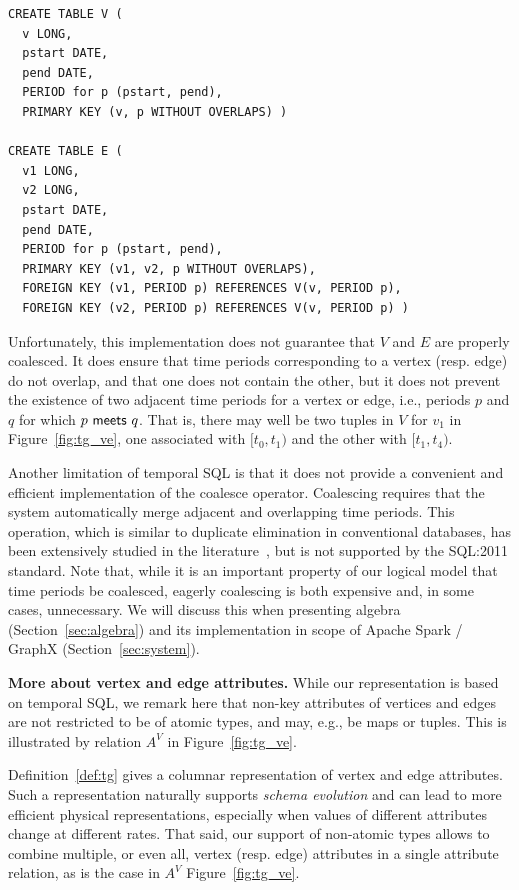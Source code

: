 \begin{small}
\begin{verbatim}
CREATE TABLE V (
  v LONG,
  pstart DATE,
  pend DATE,
  PERIOD for p (pstart, pend),
  PRIMARY KEY (v, p WITHOUT OVERLAPS) )

CREATE TABLE E (
  v1 LONG,
  v2 LONG,
  pstart DATE,
  pend DATE,
  PERIOD for p (pstart, pend),
  PRIMARY KEY (v1, v2, p WITHOUT OVERLAPS),
  FOREIGN KEY (v1, PERIOD p) REFERENCES V(v, PERIOD p),
  FOREIGN KEY (v2, PERIOD p) REFERENCES V(v, PERIOD p) )
\end{verbatim}
\end{small}

Unfortunately, this implementation does not guarantee that $V$ and $E$
are properly coalesced.  It does ensure that time periods
corresponding to a vertex (resp. edge) do not overlap, and that one
does not contain the other, but it does not prevent the existence of
two adjacent time periods for a vertex or edge, i.e., periods $p$ and
$q$ for which $p~\mathsf{meets}~q$.  That is, there may well be two
tuples in $V$ for $v_1$ in Figure~\ref{fig:tg_ve}, one associated with
$[t_0,t_1)$ and the other with $[t_1,t_4)$.

Another limitation of temporal SQL is that it does not provide a
convenient and efficient implementation of the coalesce operator.
Coalescing requires that the system automatically merge adjacent and
overlapping time periods.  This operation, which is similar to
duplicate elimination in conventional databases, has been extensively
studied in the
literature~\cite{DBLP:conf/vldb/BohlenSS96,DBLP:journals/sigmod/Zimanyi06},
but is not supported by the SQL:2011 standard.  Note that, while it is
an important property of our logical model that time periods be
coalesced, eagerly coalescing is both expensive and, in some cases,
unnecessary.  We will discuss this when presenting \tg algebra
(Section~\ref{sec:algebra}) and its implementation in scope of Apache
Spark / GraphX (Section~\ref{sec:system}).

{\bf More about vertex and edge attributes.} While our \ve
representation is based on temporal SQL, we remark here that non-key
attributes of vertices and edges are not restricted to be of atomic
types, and may, e.g., be maps or tuples. This is illustrated by
relation $A^V$ in Figure~\ref{fig:tg_ve}.

Definition~\ref{def:tg} gives a columnar representation of vertex and
edge attributes.  Such a representation naturally supports {\em schema
  evolution} and can lead to more efficient physical representations,
especially when values of different attributes change at different
rates.  That said, our support of non-atomic types allows to combine
multiple, or even all, vertex (resp. edge) attributes in a single
attribute relation, as is the case in $A^V$ Figure~\ref{fig:tg_ve}.

